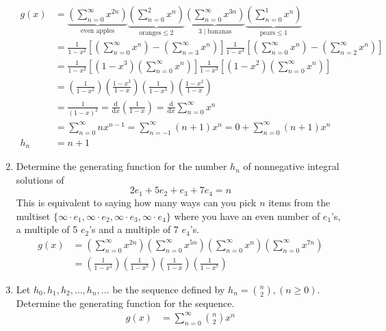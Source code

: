 \documentclass{article}
\begin{document}
\begin{enumerate}
\begin{align*}
  g(x)&=\underbrace{\left(\sum\limits_{n=0}^\infty{x^{2n}}\right)}_{\text{even apples}}\underbrace{\left(\sum\limits_{n=0}^2{x^n}\right)}_{\text{oranges}\le 2}\underbrace{\left(\sum\limits_{n=0}^\infty{x^{3n}}\right)}_{3\mid \text{bananas}}\underbrace{\left(\sum\limits_{n=0}^1{x^{n}}\right)}_{\text{pears}\le 1}\\
  &=\frac{1}{1-x^2}\left[\left(\sum\limits_{n=0}^\infty{x^n}\right)-\left(\sum\limits_{n=3}^\infty{x^n}\right)\right]\frac{1}{1-x^3}\left[\left(\sum\limits_{n=0}^\infty{x^n}\right)-\left(\sum\limits_{n=2}^\infty{x^n}\right)\right]\\
  &=\frac{1}{1-x^2}\left[\left(1-x^3\right)\left(\sum\limits_{n=0}^\infty{x^n}\right)\right]\frac{1}{1-x^3}\left[\left(1-x^2\right)\left(\sum\limits_{n=0}^\infty{x^n}\right)\right]\\
  &=\left(\frac{1}{1-x^2}\right)\left(\frac{1-x^3}{1-x}\right)\left(\frac{1}{1-x^3}\right)\left(\frac{1-x^2}{1-x}\right)\\
  &=\frac{1}{(1-x)^2}
  =\frac{\mathrm{d}}{\mathrm{d}x}\left(\frac{1}{1-x}\right)
  =\frac{\mathrm{d}}{\mathrm{d}x}\sum\limits_{n=0}^\infty{x^n}\\
  &=\sum\limits_{n=0}^\infty{nx^{n-1}}
  =\sum\limits_{n=-1}^\infty{(n+1)x^{n}}
  =0+\sum\limits_{n=0}^\infty{(n+1)x^{n}}\\
  h_n&=n+1
\end{align*}
\item
Determine the generating function for the number $h_n$ of nonnegative integral solutions of
\[2e_1+5e_2+e_3+7e_4=n\]
This is equivalent to saying how many ways can you pick $n$ items from the multiset $\{\infty\cdot e_1,\infty\cdot e_2,\infty\cdot e_3,\infty\cdot e_4\}$ where you have an even number of $e_1$'s, a multiple of 5 $e_2$'s and a multiple of 7 $e_4$'s.
\begin{align*}
  g(x)&=\left(\sum\limits_{n=0}^\infty{x^{2n}}\right)\left(\sum\limits_{n=0}^\infty{x^{5n}}\right)\left(\sum\limits_{n=0}^\infty{x^{n}}\right)\left(\sum\limits_{n=0}^\infty{x^{7n}}\right)\\
  &=\left(\frac{1}{1-x^2}\right)\left(\frac{1}{1-x^5}\right)\left(\frac{1}{1-x}\right)\left(\frac{1}{1-x^7}\right)
\end{align*}
\item
Let $h_0,h_1,h_2,\dots,h_n,\dots$ be the sequence defined by $h_n=\binom{n}{2},(n\ge0)$. Determine the generating function for the sequence.
\begin{align*}
  g(x)&=\sum\limits_{n=0}^\infty{\binom{n}{2}x^n}\\

\end{align*}
\end{enumerate}
\end{document}
